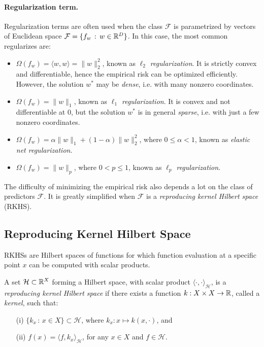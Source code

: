 \paragraph*{Regularization term.}  Regularization terms are often used when the class $\mathcal F$
 is parametrized by vectors of Euclidean space $\mathcal F=\{f_w\,:\,w\in\mathbb{R}^D\}$. In this
case, the most common regularizes are:

\begin{itemize}
\item $\Omega(f_w)=\langle w,w\rangle=\|w\|_2^2$, known as {\em $\ell_2$ regularization}. It is strictly convex and differentiable,
hence the empirical risk %
can be optimized efficiently. However, the solution $w^*$ may be {\em dense}, i.e. with many nonzero coordinates.
\item $\Omega(f_w)=\|w\|_1$, known as {\em $\ell_1$ regularization}. It is convex and not differentiable at $0$, but the
solution  $w^*$ is in general {\em sparse}, i.e. with just a few nonzero coordinates.
\item $\Omega(f_w)=\alpha\|w\|_1 + (1-\alpha)\|w\|_2^2$, where $0\leq \alpha < 1$, known as {\em elastic net regularization}.
\item $\Omega(f_w)=\|w\|_p$, where $0<p\leq 1$, known as {\em $\ell_p$ regularization}.
\end{itemize}

The difficulty of minimizing the empirical risk
also depends a lot on the class of predictors $\mathcal F$. 
It is greatly simplified when $\mathcal F$ is a {\em reproducing kernel Hilbert space} (RKHS). 


\subsection{Reproducing Kernel Hilbert Space}

RKHSs are Hilbert spaces of functions for which function evaluation at a specific point $x$ can be computed with scalar products.

\begin{defin}
A set $\mathcal H\subset \mathbb{R}^X$ forming a Hilbert space, with scalar product $\langle\cdot,\cdot\rangle_{\mathcal H}$, is
a {\em reproducing kernel Hilbert space} if there exists a function $k:X\times X\rightarrow\mathbb{R}$, called a {\em kernel}, such that:
\begin{itemize}
\item[\rm (i)] $\{k_x\,:\,x\in X\}\subset\mathcal H$, where $k_x:x\mapsto k(x,\cdot)$, and
\item[\rm (ii)] $f(x)=\langle f,k_x \rangle_{\mathcal H}$, for any $x\in X$ and $f\in\mathcal H$.
\end{itemize}
\end{defin} 

